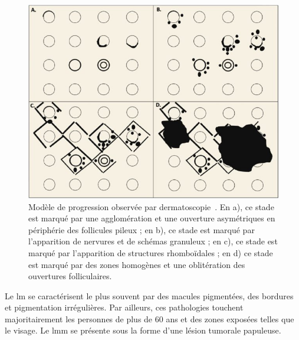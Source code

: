 \begin{figure}[H]
    \centering
    \includegraphics[width=0.8\linewidth]{contents/chapter_1/resources/illustration_surface_progression.jpg}
    \caption{Modèle de progression observée par dermatoscopie~\cite{Navarrete-Dechent2020}. En a), ce stade est marqué par une agglomération et une ouverture asymétriques en périphérie des follicules pileux ; en b), ce stade est marqué par l'apparition de nervures et de schémas granuleux ; en c), ce stade est marqué par l'apparition de structures rhomboïdales ; en d) ce stade est marqué par des zones homogènes et une oblitération des ouvertures folliculaires.}
    \label{fig:illustration_surface_progression}
\end{figure}\par

Le \gls{lm} se caractérisent le plus souvent par des macules pigmentées, des bordures et pigmentation irrégulières. Par ailleurs, ces pathologies touchent majoritairement les personnes de plus de 60 ans et des zones exposées telles que le visage. Le \gls{lmm} se présente sous la forme d'une lésion tumorale papuleuse.\par

